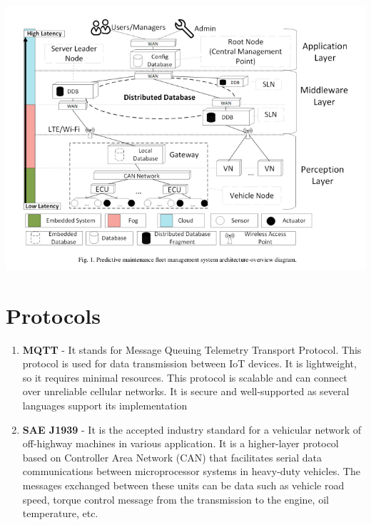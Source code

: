 \documentclass{report}
\begin{document}
    \begin{center}
    \includegraphics[scale=0.75]{architecture.png}
    \end{center}

     
    \section*{Protocols}
    \begin{enumerate}
        \item \textbf{MQTT}  - It stands for Message Queuing Telemetry Transport Protocol. This protocol is used for data transmission between IoT devices. It is lightweight, so it requires minimal resources. This protocol is scalable and can connect over unreliable cellular networks. It is secure and well-supported as several languages support its implementation 
        \item \textbf{SAE J1939} - It is the accepted industry standard for a vehicular network of off-highway machines in various application. It is a higher-layer protocol based on Controller Area Network (CAN) that facilitates serial data communications between microprocessor systems in heavy-duty vehicles. The messages exchanged between these units can be data such as vehicle road speed, torque control message from the transmission to the engine, oil temperature, etc.
       
    \end{enumerate}
\end{document}
